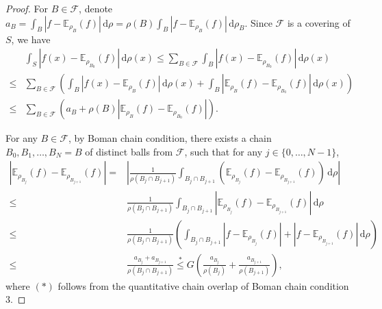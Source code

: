 \documentclass[a4paper,11pt]{article}
\numberwithin{equation}{section}
\theoremstyle{plain}
\theoremstyle{definition}
\theoremstyle{remark}
\newcommand{\E}{\mathbb{E}}
\renewcommand{\d}{{\mathrm d}}
\begin{document}
\begin{appendices}
\begin{proof}
   For  $B\in\mathcal{F}$,  	denote $a_B=\int_B |f-\E_{\rho_{B}}(f)|\,\d\rho=\rho(B)\int_B |f-\E_{\rho_{B}}(f)|\,\d\rho_B$. Since $\mathcal{F}$ is a covering of $S$, we have
    	\begin{equation}\label{A.3}
    		\begin{aligned}
    			&\int_S |f(x)-\E_{\rho_{B_0}}(f)|\,\d\rho(x)
    			\leq  \sum_{B \in \mathcal{F}} \int_B |f(x)-\E_{\rho_{B_0}}(f)|\,\d\rho(x)\\
    			\leq & \sum_{B \in \mathcal{F}} \left(\int_B |f(x)-\E_{\rho_{B}}(f)|\,\d\rho(x)+\int_B |\E_{\rho_{B}}(f)-\E_{\rho_{B_0}}(f)|\,\d\rho(x)\right)\\
    			\leq &  \sum_{B \in \mathcal{F}} \left(a_B+\rho(B) |\E_{\rho_{B}}(f)-\E_{\rho_{B_0}}(f)|\right).
    		\end{aligned}
    	\end{equation}
    	
    	For any $B\in\mathcal{F}$, by Boman chain condition, there exists a chain $B_0, B_1,\dots, B_N=B$ of distinct balls from \(\mathcal{F}\), such that for any \(j \in \{0, \ldots, N-1\}\),
    	\begin{equation}
    		\begin{aligned}
    		|\E_{\rho_{B_j}}(f)-\E_{\rho_{B_{j+1}}}(f)|= &\left|\frac{1}{\rho(B_j\cap B_{j+1})}\int_{B_j\cap B_{j+1}}\left(\E_{\rho_{B_j}}(f)-\E_{\rho_{B_{j+1}}}(f)\right)\,\d\rho\right|\\
    		\leq &\frac{1}{\rho(B_j\cap B_{j+1})}\int_{B_j\cap B_{j+1}}\left|\E_{\rho_{B_j}}(f)-\E_{\rho_{B_{j+1}}}(f)\right|\,\d\rho\\
    		\leq &\frac{1}{\rho(B_j\cap B_{j+1})}\left(\int_{B_j\cap B_{j+1}}\left|f-\E_{\rho_{B_j}}(f)\right|+\left|f-\E_{\rho_{B_{j+1}}}(f)\right|\,\d\rho\right)\\
    		\leq & \frac{a_{B_j}+a_{B_{j+1}}}{\rho(B_j\cap B_{j+1})}
    		\overset{*}{\leq}  G \left(\frac{a_{B_j}}{\rho(B_j)}+\frac{a_{B_{j+1}}}{\rho(B_{j+1})}\right),
    		\end{aligned}
    	\end{equation}
    	where $(*)$ follows from the quantitative chain overlap of Boman chain condition $3$.
    	 

\end{proof}
\end{appendices}
\end{document}
